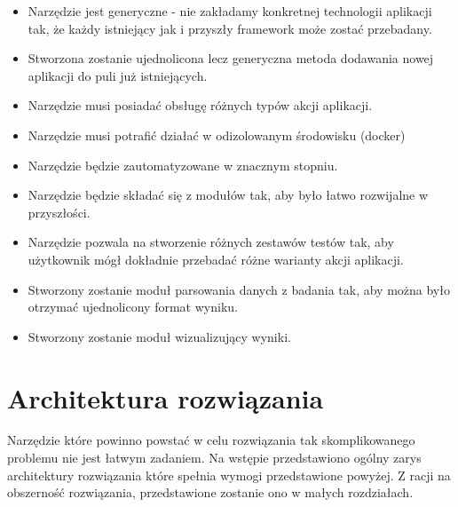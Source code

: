 \begin{itemize}
    \item Narzędzie jest generyczne - nie zakładamy konkretnej technologii aplikacji tak, że każdy istniejący jak i przyszły framework może zostać przebadany.
    \item Stworzona zostanie ujednolicona lecz generyczna metoda dodawania nowej aplikacji do puli już istniejących. 
    \item Narzędzie musi posiadać obsługę różnych typów akcji aplikacji.
    \item Narzędzie musi potrafić działać w odizolowanym środowisku (docker)
    \item Narzędzie będzie zautomatyzowane w znacznym stopniu.
    \item Narzędzie będzie składać się z modułów tak, aby było łatwo rozwijalne w przyszłości.
    \item Narzędzie pozwala na stworzenie różnych zestawów testów tak, aby użytkownik mógł dokładnie przebadać różne warianty akcji aplikacji.
    \item Stworzony zostanie moduł parsowania danych z badania tak, aby można było otrzymać ujednolicony format wyniku.
    \item Stworzony zostanie moduł wizualizujący wyniki.
\end{itemize}

\section{Architektura rozwiązania}

Narzędzie które powinno powstać w celu rozwiązania tak skomplikowanego problemu nie jest łatwym zadaniem.
Na wstępie przedstawiono ogólny zarys architektury rozwiązania które spełnia wymogi przedstawione powyżej.
Z racji na obszerność rozwiązania, przedstawione zostanie ono w małych rozdziałach.

